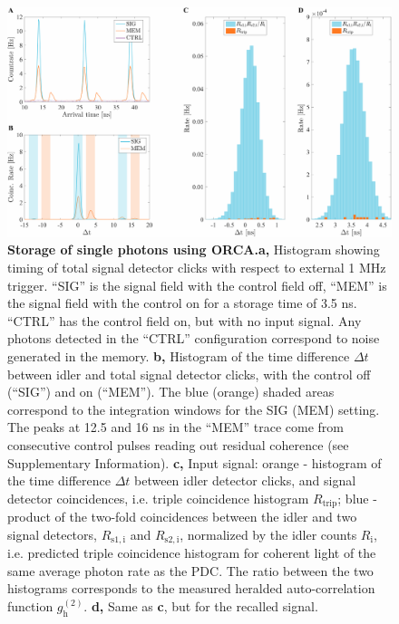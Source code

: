 \documentclass[12pt]{iopart}
\begin{document}
\begin{figure}[h!]
\includegraphics[width=\textwidth, right]{ORCApaperFig3c.pdf} 
\caption{\textbf{Storage of single photons using ORCA.}\newline \textbf{a,} Histogram showing timing of total signal detector clicks with respect to external 1 MHz trigger. ``SIG'' is the signal field with the control field off, ``MEM'' is the signal field with the control on for a storage time of 3.5 ns. ``CTRL'' has the control field on, but with no input signal. Any photons detected in the ``CTRL'' configuration correspond to noise generated in the memory. \textbf{b,} Histogram of the time difference $\Delta t$ between idler and total signal detector clicks, with the control off (``SIG'') and on (``MEM''). The blue (orange) shaded areas correspond to the integration windows for the SIG (MEM) setting. The peaks at 12.5 and 16 ns in the ``MEM'' trace come from consecutive control pulses reading out residual coherence (see Supplementary Information). \textbf{c,} Input signal: orange - histogram of the time difference $\Delta t$ between idler detector clicks, and signal detector coincidences, i.e. triple coincidence histogram $R_\mathrm{trip}$; blue - product of the two-fold coincidences between the idler and two signal detectors, $R_\mathrm{s1,i}$ and $R_\mathrm{s2,i}$, normalized by the idler counts $R_\mathrm{i}$, i.e. predicted triple coincidence histogram for coherent light of the same average photon rate as the PDC. The ratio between the two histograms corresponds to the measured heralded auto-correlation function $g^{(2)}_\mathrm{h}$. \textbf{d,} Same as \textbf{c}, but for the recalled signal.}
\label{fig:figFig3}
\end{figure}
\end{document}
